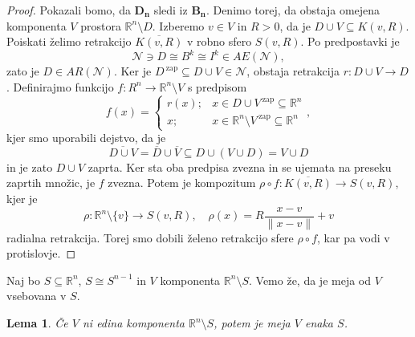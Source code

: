 \documentclass[10pt, a4paper]{article}
\newtheorem{lema}[izr]{Lema}
\newenvironment{noticeC}{%
  \tcolorbox[%
  notitle,
  empty,
  enhanced,  %
  breakable,
  coltext=black, 
  fontupper=\rmfamily,
  parbox=false,
  noparskip,
  sharp corners,
  boxrule=-1pt,  %
  frame hidden,
  left=7pt,  %
  right=7pt,
  top=5pt,
  bottom=5pt,
  before skip=2.5ex plus 2pt,
  after skip=2.5ex plus 2pt,
  overlay unbroken and last={%
  },
  ]}
{\endtcolorbox}
\newenvironment{dokaz}%
  {\begin{noticeC}\begin{proof}}%
  {\end{proof}\end{noticeC}}
\newcommand{\R}{\mathbb {R}}
\begin{document}
\begin{dokaz}
  Pokazali bomo, da $\mathbf{D_n}$ sledi iz $\mathbf{B_n}$. Denimo torej, da obstaja omejena komponenta $V$ prostora $\R^n \setminus D$.
  Izberemo $v \in V$ in $R > 0$, da je $D \cup V \subseteq K(v, R)$. Poiskati želimo retrakcijo $\overline{K(v, R)}$ v robno 
  sfero $S(v, R)$. Po predpostavki je 
  $$\mathcal{N} \ni D \cong B^k \cong I^k \in AE(\mathcal{N}),$$
  zato je $D \in AR(\mathcal{N})$. Ker je $D^{\ \text{zap}} \subseteq D \cup V \in \mathcal{N}$, obstaja retrakcija 
  $r: D \cup V \to D$. Definirajmo funkcijo $f: R^n \to \R^n \setminus V$ s predpisom 
  $$f(x) = \begin{cases}
    r(x) ;& x \in D \cup V^{\ \text{zap}} \subseteq \R^n\\
    x ;& x \in \R^n \setminus V^{\ \text{zap}} \subseteq \R^n
  \end{cases},$$
  kjer smo uporabili dejstvo, da je $$\overline{D \cup V} = \overline{D} \cup \overline{V} \subseteq D \cup (V \cup D) = V \cup D$$
  in je zato $D \cup V$ zaprta. Ker sta oba predpisa zvezna in se ujemata na preseku zaprtih množic,
  je $f$ zvezna. Potem je kompozitum $\rho \circ f: \overline{K(v, R)} \to S(v, R)$, kjer je 
  $$\rho: \R^n \setminus \{v\} \to S(v, R),\quad \rho (x) = R \frac{x - v}{\|x - v\|} + v$$
  radialna retrakcija. Torej smo dobili želeno retrakcijo sfere $\rho \circ f$, kar pa vodi v protislovje.
\end{dokaz}

Naj bo $S \subseteq \R^n$, $S \cong S^{n - 1}$ in $V$ komponenta $\R^n \setminus S$. Vemo že,
da je meja od $V$ vsebovana v $S$.

\begin{lema}
  Če $V$ ni edina komponenta $\R^n \setminus S$, potem je meja $V$ enaka $S$.
\end{lema}
\end{document}
